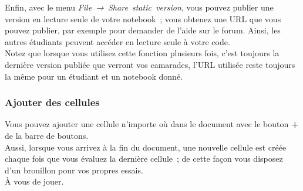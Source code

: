     Enfin, avec le menu \emph{File~→~Share~static~version}, vous pouvez
publier une version en lecture seule de votre notebook~; vous obtenez
une URL que vous pouvez publier, par exemple pour demander de l'aide sur
le forum. Ainsi, les autres étudiants peuvent accéder en lecture seule à
votre code.\\

    Notez que lorsque vous utilisez cette fonction plusieurs fois, c'est
toujours la dernière version publiée que verront vos camarades, l'URL
utilisée reste toujours la même pour un étudiant et un notebook donné.

    \hypertarget{ajouter-des-cellules}{%
\subsubsection{Ajouter des cellules}\label{ajouter-des-cellules}}

    Vous pouvez ajouter une cellule n'importe où dans le document avec le
bouton \textbf{+} de la barre de boutons.\\

Aussi, lorsque vous arrivez à la fin du document, une nouvelle cellule
est créée chaque fois que vous évaluez la dernière cellule~; de cette
façon vous disposez d'un brouillon pour vos propres essais.\\

À vous de jouer.
